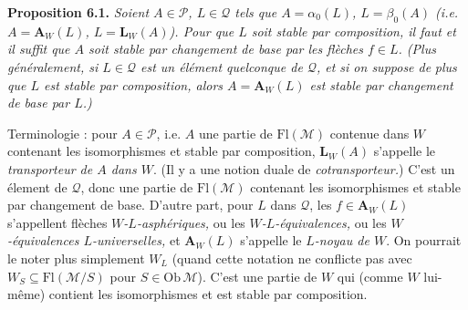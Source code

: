 \documentclass[11pt]{article}
\def\dcprintedpending{}
\newcommand{\msp}[1]{\marginpar{\footnotesize\raggedright
  \ifx\dcprintedpending\empty\else p.~\dcprintedpending\par\fi
  [#1]}\gdef\dcprintedpending{}}
\newcommand{\Fl}{\mathrm{Fl}}
\begin{document}
\textbf{Proposition 6.1.} \textit{Soient $A \in \mathcal{P}$, $L \in \mathcal{Q}$ tels que $A = \alpha_0(L)$, $L = \beta_0(A)$ (i.e. $A = \mathbf{A}_W(L)$, $L = \mathbf{L}_W(A)$). Pour que $L$ soit stable par composition, il faut et il suffit que $A$ soit stable par changement de base par les flèches $f \in L$. (Plus généralement, si $L \in \mathcal{Q}$ est un élément quelconque de $\mathcal{Q}$, et si on suppose de} \msp{page 88} \textit{plus que $L$ est stable par composition, alors $A = \mathbf{A}_W(L)$ est stable par changement de base par $L$.)}

Terminologie : pour $A \in \mathcal{P}$, i.e. $A$ une partie de $\Fl(\mathcal{M})$ contenue dans $W$ contenant les isomorphismes et stable par composition, $\mathbf{L}_W(A)$ s'appelle le \textit{transporteur de $A$ dans $W$}. (Il y a une notion duale de \textit{cotransporteur.}) C'est un élement de $\mathcal{Q}$, donc une partie de $\Fl(\mathcal{M})$ contenant les isomorphismes et stable par changement de base. D'autre part, pour $L$ dans $\mathcal{Q}$, les $f \in \mathbf{A}_W(L)$ s'appellent flèches \textit{$W$-$L$-asphériques,} ou les \textit{$W$-$L$-équivalences,} ou les \textit{$W$-équivalences $L$-universelles,} et $\mathbf{A}_W(L)$ s'appelle le \textit{$L$-noyau de $W$}. On pourrait le noter plus simplement $W_L$ (quand cette notation ne conflicte pas avec $W_S \subseteq \Fl(\mathcal{M}/S)$ pour $S \in \mathrm{Ob}\,\mathcal{M}$). C'est une partie de $W$ qui (comme $W$ lui-même) contient les isomorphismes et est stable par composition. %
\end{document}
